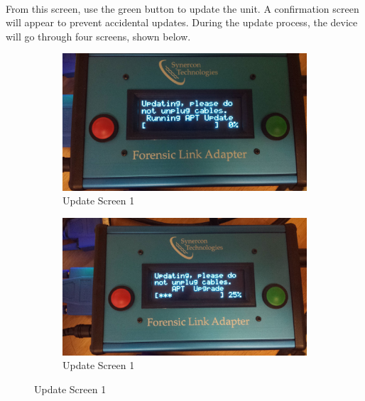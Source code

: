 \documentclass[11pt]{article}
\begin{document}
\\[\baselineskip]
From this screen, use the green button to update the unit. A confirmation screen will appear to prevent accidental updates.\newline
During the update process, the device will go through four screens, shown below.

\begin{figure}[tbph]
        \centering
        \begin{subfigure}[b]{0.475\textwidth}
            \centering
            \includegraphics[width=\textwidth]{../media/fla_screens/update_apt}
            \caption[Network2]%
            {{\small Update Screen 1}}    
            \label{fig:fla_update_1}
        \end{subfigure}
        \hfill
        \begin{subfigure}[b]{0.475\textwidth}  
            \centering 
            \includegraphics[width=\textwidth]{../media/fla_screens/update_apt_upgrade}
            \caption[]%
            {{\small Update Screen 1}}    
            \label{fig:fla_update_2}
        \end{subfigure}

\end{figure}
\end{document}

